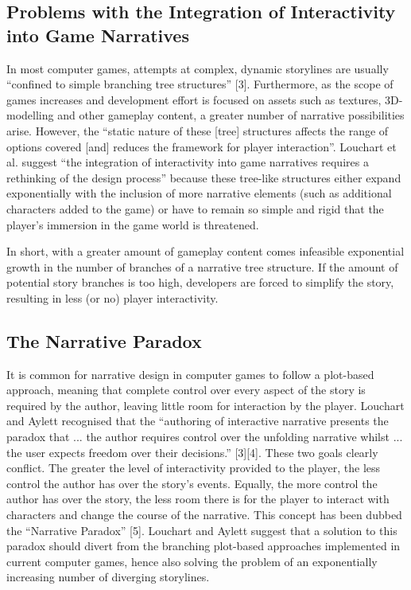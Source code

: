 \documentclass{sig-alternate-05-2015}
\begin{document}
\subsection{Problems with the Integration of Interactivity into Game Narratives}

In most computer games, attempts at complex, dynamic storylines are usually ``confined to simple branching tree structures'' [3]. Furthermore, as the scope of games increases and development effort is focused on assets such as textures, 3D-modelling and other gameplay content, a greater number of narrative possibilities arise. However, the ``static nature of these [tree] structures affects the range of options covered [and] reduces the framework for player interaction''. Louchart et al. suggest ``the integration of interactivity into game narratives requires a rethinking of the design process'' because these tree-like structures either expand exponentially with the inclusion of more narrative elements (such as additional characters added to the game) or have to remain so simple and rigid that the player's immersion in the game world is threatened.

In short, with a greater amount of gameplay content comes infeasible exponential growth in the number of branches of a narrative tree structure. If the amount of potential story branches is too high, developers are forced to simplify the story, resulting in less (or no) player interactivity.

\subsection{The Narrative Paradox}

It is common for narrative design in computer games to follow a plot-based approach, meaning that complete control over every aspect of the story is required by the author, leaving little room for interaction by the player. Louchart and Aylett recognised that the ``authoring of interactive narrative presents the paradox that ... the author requires control over the unfolding narrative whilst ... the user expects freedom over their decisions.'' [3][4]. These two goals clearly conflict. The greater the level of interactivity provided to the player, the less control the author has over the story's events. Equally, the more control the author has over the story, the less room there is for the player to interact with characters and change the course of the narrative. This concept has been dubbed the ``Narrative Paradox'' [5]. Louchart and Aylett suggest that a solution to this paradox should divert from the branching plot-based approaches implemented in current computer games, hence also solving the problem of an exponentially increasing number of diverging storylines.
\end{document}
